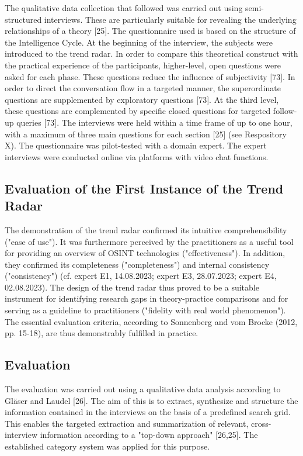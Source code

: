 \documentclass[10pt]{article}
\begin{document}
The qualitative data collection that followed was carried out using
semi-structured interviews. These are particularly suitable for
revealing the underlying relationships of a theory [25]. The
questionnaire used is based on the structure of the Intelligence Cycle.
At the beginning of the interview, the subjects were introduced to the
trend radar. In order to compare this theoretical construct with the
practical experience of the participants, higher-level, open questions
were asked for each phase. These questions reduce the influence of
subjectivity [73]. In order to direct the conversation flow in a
targeted manner, the superordinate questions are supplemented by
exploratory questions [73]. At the third level, these questions are
complemented by specific closed questions for targeted follow-up
queries [73]. The interviews were held within a time frame of up to
one hour, with a maximum of three main questions for each section
 [25] (see Respository X). The questionnaire was pilot-tested with a
domain expert. The expert interviews were conducted online via
platforms with video chat functions.

\subsection{Evaluation of the First Instance of the Trend Radar}

The demonstration of the trend radar confirmed its intuitive
comprehensibility ("ease of use"). It was furthermore perceived by the
practitioners as a useful tool for providing an overview of OSINT
technologies ("effectiveness"). In addition, they confirmed its
completeness ("completeness") and internal consistency ("consistency")
(cf. expert E1, 14.08.2023; expert E3, 28.07.2023; expert E4,
02.08.2023). The design of the trend radar thus proved to be a
suitable instrument for identifying research gaps in theory-practice
comparisons and for serving as a guideline to practitioners
("fidelity with real world phenomenon"). The essential evaluation
criteria, according to Sonnenberg and vom Brocke (2012, pp. 15-18),
are thus demonstrably fulfilled in practice.

\subsection{Evaluation}

The evaluation was carried out using a qualitative data analysis
according to Gläser and Laudel [26]. The aim of this is to extract,
synthesize and structure the information contained in the interviews
on the basis of a predefined search grid. This enables the targeted
extraction and summarization of relevant, cross-interview information
according to a "top-down approach" [26,25]. The established category
system was applied for this purpose.
\end{document}

